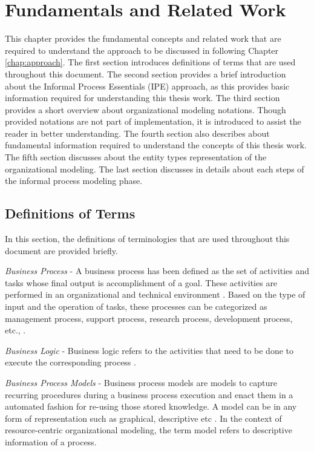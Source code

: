 \chapter{Fundamentals and Related Work}
\label{chap:fundamentals}
This chapter provides the fundamental concepts and related work that are required to understand the approach to be discussed in following Chapter \ref{chap:approach}. The first section introduces definitions of terms that are used throughout this document. The second section provides a brief introduction about the Informal Process Essentials (IPE) approach, as this provides basic information required for understanding this thesis work. The third section provides a short overview about organizational modeling notations. Though provided notations are not part of implementation, it is introduced to assist the reader in better understanding. The fourth section also describes about fundamental information required to understand the concepts of this thesis work. The fifth section discusses about the entity types representation of the organizational modeling. The last section discusses in details about each steps of the informal process modeling phase. 

\section{Definitions of Terms}
\label{sec:termdefinitions}
In this section, the definitions of terminologies that are used throughout this document are provided briefly.

\textit{Business Process} -  A business process has been defined as the set of activities and tasks whose final output is accomplishment of a goal. These activities are performed in an organizational and technical environment \cite{Weske2012}.  Based on the type of input and the operation of tasks, these processes can be categorized as management process, support process, research process, development process, etc., \cite{Sungur2015}.   

\textit{Business Logic} - Business logic refers to the activities that need to be done to execute the corresponding process \cite{Weske2012}. 

\textit{Business Process Models} - Business process models are models to capture recurring procedures during a business process execution and enact them in a automated fashion for re-using those stored knowledge. A model can be in any form of representation such as graphical, descriptive etc \cite{Weske2012}. In the context of resource-centric organizational modeling, the term model refers to descriptive information of a process. 

